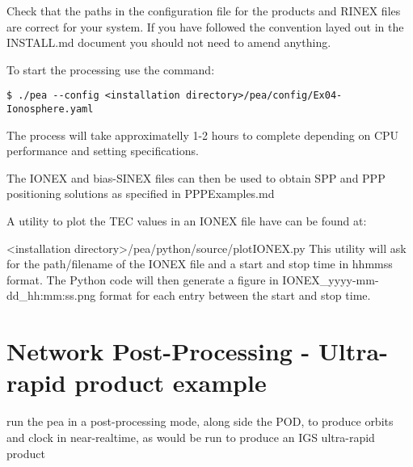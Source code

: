 Check that the paths in the configuration file for the products and RINEX files are correct for your system. 
If you have followed the convention layed out in the INSTALL.md document you should not need to amend anything.

To start the processing use the command:
\begin{verbatim}
$ ./pea --config <installation directory>/pea/config/Ex04-Ionosphere.yaml
\end{verbatim}

The process will take approximatelly 1-2 hours to complete depending on CPU performance and setting specifications.

The IONEX and bias-SINEX files can then be used to obtain SPP and PPP positioning solutions as specified in PPPExamples.md

A utility to plot the TEC values in an IONEX file have can be found at:

<installation directory>/pea/python/source/plotIONEX.py
This utility will ask for the path/filename of the IONEX file and a start and stop time in hhmmss format. The Python code will then generate a figure in IONEX\_yyyy-mm-dd\_hh:mm:ss.png format for each entry between the start and stop time.

\section{Network Post-Processing - Ultra-rapid product example}

 run the pea in a post-processing mode, along side the POD, to produce orbits and clock in near-realtime, as would be run to produce an IGS ultra-rapid product





